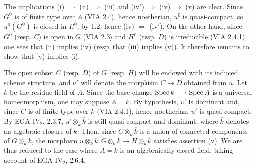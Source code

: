 The implications (i) $\Rightarrow$ (ii) $\Rightarrow$ (iii) and (iv$'$) $\Rightarrow$ (iv) $\Rightarrow$ (v) are clear. Since $G^0$ is of finite type over $A$ (VIA 2.4), hence noetherian, $u^0$ is quasi-compact, so $u^0(G^0)$ is closed in $H^0$, by 1.2, hence (iv) $\Rightarrow$ (iv$'$). On the other hand, since $G^0$ (resp. $C$) is open in $G$ (VIA 2.3) and $H^0$ (resp. $D$) is irreducible (VIA 2.4.1), one sees that (ii) implies (iv) (resp. that (iii) implies (v)). It therefore remains to show that (v) implies (i).

The open subset $C$ (resp. $D$) of $G$ (resp. $H$) will be endowed with its induced scheme structure, and $u'$ will denote the morphism $C\to D$ obtained from $u$. Let $k$ be the residue field of $A$. Since the base change $\operatorname{Spec} k\longrightarrow\operatorname{Spec} A$ is a universal homeomorphism, one may suppose $A=k$. By hypothesis, $u'$ is dominant and, since $C$ is of finite type over $k$ (VIA 2.4.1), hence noetherian, $u'$ is quasi-compact. By EGA IV$_2$, 2.3.7, $u'\otimes_k\overline k$ is still quasi-compact and dominant, where $\overline k$ denotes an algebraic closure of $k$. Then, since $C\otimes_k\overline k$ is a union of connected components of $G\otimes_k\overline k$, the morphism $u\otimes_k\overline k:G\otimes_k\overline k\to H\otimes_k\overline k$ satisfies assertion (v). We are thus reduced to the case where $A=k$ is an algebraically closed field, taking account of EGA IV$_2$, 2.6.4.

